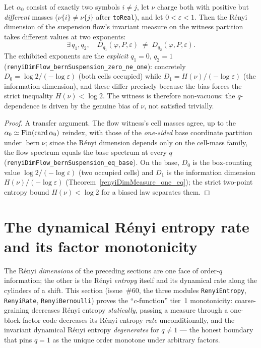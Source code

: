 \begin{theorem}\label{renyiDimFlow_bernSuspension_q_dependent}
  \leanok
  Let \(\alpha_0\) consist of exactly two symbols \(i \ne j\), let \(\nu\) charge both with
  positive but \emph{different} masses (\(\nu\{i\} \ne \nu\{j\}\) after \texttt{toReal}), and let
  \(0 < \varepsilon < 1\). Then the R\'enyi dimension of the suspension flow's invariant measure
  on the witness partition takes different values at two exponents:
  \[
    \exists\, q_1, q_2, \quad
    D_{q_1}(\varphi, P, \varepsilon) \;\ne\; D_{q_2}(\varphi, P, \varepsilon).
  \]
  The exhibited exponents are the \emph{explicit} \(q_1 = 0\), \(q_2 = 1\)
  (\texttt{renyiDimFlow\_bernSuspension\_zero\_ne\_one}): concretely
  \(D_0 = \log 2 / (-\log\varepsilon)\) (both cells occupied) while
  \(D_1 = H(\nu)/(-\log\varepsilon)\) (the information dimension), and these differ precisely
  because the bias forces the strict inequality \(H(\nu) < \log 2\). The witness is therefore
  non-vacuous: the \(q\)-dependence is driven by the genuine bias of \(\nu\), not satisfied
  trivially.
\end{theorem}
\begin{proof}\leanok
  A transfer argument. The flow witness's cell masses agree, up to the
  \(\alpha_0 \simeq \operatorname{Fin}(\operatorname{card}\alpha_0)\) reindex, with those of the \emph{one-sided} base
  coordinate partition under \(\operatorname{bern}\nu\); since the R\'enyi dimension depends only
  on the cell-mass family, the flow spectrum equals the base spectrum at every \(q\)
  (\texttt{renyiDimFlow\_bernSuspension\_eq\_base}). On the base, \(D_0\) is the box-counting
  value \(\log 2 / (-\log\varepsilon)\) (two occupied cells) and \(D_1\) is the information
  dimension \(H(\nu)/(-\log\varepsilon)\) (Theorem~\ref{renyiDimMeasure_one_eq}); the strict
  two-point entropy bound \(H(\nu) < \log 2\) for a biased law separates them.
\end{proof}

\section{The dynamical R\'enyi entropy rate and its factor monotonicity}

The R\'enyi \emph{dimensions} of the preceding sections are one face of order-\(q\) information; the
other is the R\'enyi \emph{entropy} itself and its dynamical rate along the cylinders of a shift.
This section (issue~\#60, the three modules \texttt{RenyiEntropy}, \texttt{RenyiRate},
\texttt{RenyiBernoulli}) proves the ``\(c\)-function'' tier~1 monotonicity: coarse-graining decreases
R\'enyi entropy \emph{statically}, passing a measure through a one-block factor code decreases its
R\'enyi entropy \emph{rate} unconditionally, and the invariant dynamical R\'enyi entropy
\emph{degenerates} for \(q \ne 1\) --- the honest boundary that pins \(q = 1\) as the unique order
monotone under arbitrary factors.

